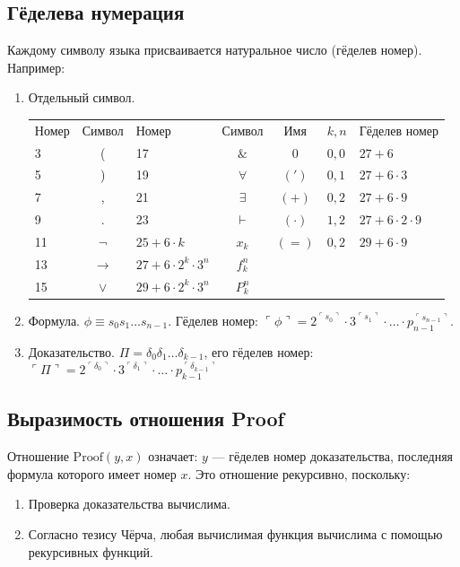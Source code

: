 \documentclass[10pt]{article}
\begin{document}
\subsection{Гёделева нумерация}
Каждому символу языка присваивается натуральное число (гёделев номер). Например:
\begin{enumerate}
\item Отдельный символ.\vspace{0.2cm}

\begin{tabular}{lc|lc||cll}
Номер & Символ & Номер & Символ & Имя & $k,n$ & Гёделев номер\\
3 & ( &               17 & $\&$ &  0 & $0,0$ & $27 + 6$\\
5 & ) &               19 & $\forall$ & $(')$ & $0,1$ & $27 + 6 \cdot 3$\\
7 & , &               21 & $\exists$ & $(+)$ & $0,2$ & $27 + 6 \cdot 9$\\
9 & . &               23 & $\vdash$ & $(\cdot)$ & $1,2$ & $27 + 6 \cdot 2 \cdot 9$\\
11 & $\neg$ &         $25 + 6\cdot k$ & $x_k$ & $(=)$ & $0,2$ & $29 + 6 \cdot 9$\\
13 & $\rightarrow$ &  $27 + 6\cdot 2^k \cdot 3^n$ & $f_k^n$\\
15 & $\vee$ &         $29 + 6\cdot 2^k \cdot 3^n$ & $P_k^n$ 
\end{tabular}

\item Формула. $\phi \equiv s_0s_1\dots s_{n-1}$. Гёделев номер: $\ulcorner\phi\urcorner = 2^{\ulcorner s_0\urcorner}\cdot 3^{\ulcorner s_1\urcorner} 
\cdot \dots \cdot p_{n-1}^{\ulcorner s_{n-1}\urcorner}$.

\item Доказательство. $\Pi = \delta_0\delta_1\dots\delta_{k-1}$, его гёделев номер: $\ulcorner\Pi\urcorner =
2^{\ulcorner \delta_0\urcorner}\cdot 3^{\ulcorner \delta_1\urcorner} \cdot \dots \cdot p_{k-1}^{\ulcorner \delta_{k-1}\urcorner}$
\end{enumerate}

\subsection{Выразимость отношения Proof}
Отношение $\mathrm{Proof}(y,x)$ означает: $y$ — гёделев номер доказательства, последняя формула которого имеет номер $x$. Это отношение рекурсивно, поскольку:
\begin{enumerate}
\item Проверка доказательства вычислима.
\item Согласно тезису Чёрча, любая вычислимая функция
вычислима с помощью рекурсивных функций.
\end{enumerate}
\end{document}
